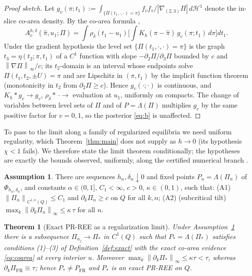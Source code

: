 \documentclass[11pt]{article}
\newtheorem{theorem}{Theorem}
\theoremstyle{definition}
\newtheorem{assumption}{Assumption}
\newcommand{\Lam}{\Lambda}
\newcommand{\norm}[1]{\left\lVert #1 \right\rVert}
\newcommand{\Hc}{\mathcal{H}}
\begin{document}
\begin{proof}[Proof sketch]
Let $g_v(\pi;t_1):=\int_{\{\Pi(t_1,\cdot,\cdot)=\pi\}}
f_vf_v/|\nabla_{(2,3)}\Pi|\,d\Hc^1$ denote the in-slice co-area density. By
the co-area formula \cite[\S3.4]{EvansGariepy},
\[
A^{h,\delta}_v(\hat\pi,u_1;\Pi)
=\int\rho_\delta(t_1-u_1)\Big[\int K_h(\pi-\hat\pi)\,g_v(\pi;t_1)\,
d\pi\Big]dt_1 .
\]
Under the gradient hypothesis the level set
$\{\Pi(t_1,\cdot,\cdot)=\pi\}$ is the graph $t_3=\eta(t_2;\pi,t_1)$ of a
$C^1$ function with slope $-\partial_2\Pi/\partial_3\Pi$ bounded by $c$ and
$\norm{\nabla\Pi}_\infty/c$; its $t_2$-domain is an interval whose endpoints
solve $\Pi(t_1,t_2,\pm U)=\pi$ and are Lipschitz in $(\pi,t_1)$ by the
implicit function theorem (monotonicity in $t_2$ from $\partial_2\Pi\ge c$).
Hence $g_v(\cdot;\cdot)$ is continuous, and
$K_h*g_v\to g_v$, $\rho_\delta*\,\cdot\to$ evaluation at $u_1$, uniformly on
compacts. The change of variables between level sets of $\Pi$ and of
$P=\Lam(\Pi)$ multiplies $g_v$ by the same positive factor for $v=0,1$, so
the posterior \eqref{eq:b} is unaffected.
\end{proof}

To pass to the limit along a family of regularized equilibria we need
uniform regularity, which Theorem~\ref{thm:main} does not supply as
$h\to0$ (its hypothesis $\chi<1$ fails). We therefore state the limit
theorem conditionally; the hypotheses are exactly the bounds observed,
uniformly, along the certified numerical branch \cite{REZN}.

\begin{assumption}\label{ass:uniform}
There are sequences $h_n,\delta_n\downarrow0$ and fixed points
$P_n=\Lam(\Pi_n)$ of $\Phi_{h_n,\delta_n}$, and constants
$\alpha\in(0,1]$, $C_1<\infty$, $c>0$, $\kappa\in(0,1)$, such that:
\textup{(A1)} $\norm{\Pi_n}_{C^{1,\alpha}(Q)}\le C_1$ and
$\partial_k\Pi_n\ge c$ on $Q$ for all $k,n$;
\textup{(A2)} (subcritical tilt)
$\max_k\norm{\partial_k\Pi_n}_\infty\le\kappa\,\tau$ for all $n$.
\end{assumption}

\begin{theorem}[Exact PR-REE as a regularization limit]\label{thm:limit}
Under Assumption~\ref{ass:uniform} there is a subsequence
$\Pi_{n_j}\to\Pi_\ast$ in $C^1(Q)$ such that $P_\ast=\Lam(\Pi_\ast)$
satisfies conditions (1)--(3) of Definition~\ref{def:exact} with the exact
co-area evidence \eqref{eq:coarea} at every interior $u$. Moreover
$\max_k\norm{\partial_k\Pi_\ast}_\infty\le\kappa\tau<\tau$, whereas
$\partial_k\Pi_{\mathrm{FR}}\equiv\tau$; hence
$P_\ast\neq P_{\mathrm{FR}}$ and $P_\ast$ is an exact PR-REE on $Q$.
\end{theorem}
\end{document}
